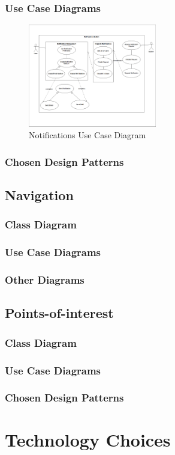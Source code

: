 \documentclass{article}
\begin{document}
        \subsubsection{Use Case Diagrams}
		\begin{figure}
  			\caption{Notifications Use Case Diagram}
  			\centering
    			\includegraphics[width=0.5\textwidth]{NotificationUseCases}
		\end{figure}
        \subsubsection{Chosen Design Patterns}
    \subsection{Navigation}
        \subsubsection{Class Diagram}
        \subsubsection{Use Case Diagrams}
        \subsubsection{Other Diagrams}
    \subsection{Points-of-interest}
        \subsubsection{Class Diagram}
        \subsubsection{Use Case Diagrams}
        \subsubsection{Chosen Design Patterns}
\section{Technology Choices}

\end{document}
